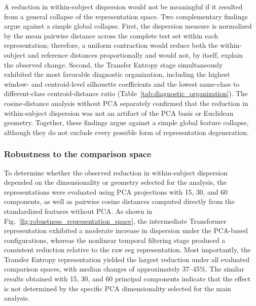 {A reduction in within-subject dispersion would not be meaningful if it resulted from a general collapse of the representation space. Two complementary findings argue against a simple global collapse. First, the dispersion measure is normalized by the mean pairwise distance across the complete test set within each representation; therefore, a uniform contraction would reduce both the within-subject and reference distances proportionally and would not, by itself, explain the observed change. Second, the Transfer Entropy stage simultaneously exhibited the most favorable diagnostic organization, including the highest window- and centroid-level silhouette coefficients and the lowest same-class to different-class centroid-distance ratio (Table~\ref{tab:diagnostic_organization}). The cosine-distance analysis without PCA separately confirmed that the reduction in within-subject dispersion was not an artifact of the PCA basis or Euclidean geometry. Together, these findings argue against a simple global feature collapse, although they do not exclude every possible form of representation degeneration.}

\subsubsection{Robustness to the comparison space}

To determine whether the observed reduction in within-subject dispersion depended on the dimensionality or geometry selected for the analysis, the representations were evaluated using PCA projections with 15, 30, and 60 components, as well as pairwise cosine distances computed directly from the standardized features without PCA. As shown in Fig.~\ref{fig:robustness_representation_space}, the intermediate Transformer representation exhibited a moderate increase in dispersion under the PCA-based configurations, whereas the nonlinear temporal filtering stage produced a consistent reduction relative to the raw \gls{eeg} representation. Most importantly, the Transfer Entropy representation yielded the largest reduction under all evaluated comparison spaces, with median changes of approximately 37--45\%. The similar results obtained with 15, 30, and 60 principal components indicate that the effect is not determined by the specific PCA dimensionality selected for the main analysis.

